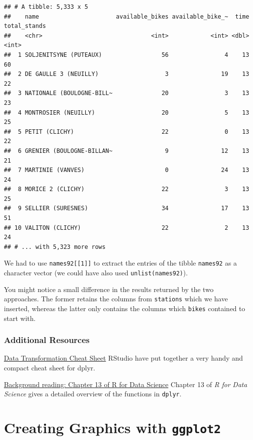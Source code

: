 \documentclass[
]{book}
\begin{document}
\begin{verbatim}
## # A tibble: 5,333 x 5
##    name                      available_bikes available_bike_~  time total_stands
##    <chr>                               <int>            <int> <dbl>        <int>
##  1 SOLJENITSYNE (PUTEAUX)                 56                4    13           60
##  2 DE GAULLE 3 (NEUILLY)                   3               19    13           22
##  3 NATIONALE (BOULOGNE-BILL~              20                3    13           23
##  4 MONTROSIER (NEUILLY)                   20                5    13           25
##  5 PETIT (CLICHY)                         22                0    13           22
##  6 GRENIER (BOULOGNE-BILLAN~               9               12    13           21
##  7 MARTINIE (VANVES)                       0               24    13           24
##  8 MORICE 2 (CLICHY)                      22                3    13           25
##  9 SELLIER (SURESNES)                     34               17    13           51
## 10 VALITON (CLICHY)                       22                2    13           24
## # ... with 5,323 more rows
\end{verbatim}

We had to use \texttt{names92{[}{[}1{]}{]}} to extract the entries of the tibble \texttt{names92} as a character vector (we could have also used \texttt{unlist(names92)}).

You might notice a small difference in the results returned by the two approaches. The former retains the columns from \texttt{stations} which we have inserted, whereas the latter only contains the columns which \texttt{bikes} contained to start with.

\hypertarget{additional-resources-2}{%
\subsection{Additional Resources}\label{additional-resources-2}}

\href{\%22https://www.rstudio.com/wp-content/uploads/2015/02/data-wrangling-cheatsheet.pdf\%22}{Data Transformation Cheat Sheet}
RStudio have put together a very handy and compact cheat sheet for dplyr.

\href{\%22http://r4ds.had.co.nz/relational-data.html\%22,\%20icon=\%22book\%22}{Background reading: Chapter 13 of R for Data Science}
Chapter 13 of \emph{R for Data Science} gives a detailed overview of the functions in \texttt{dplyr}.

\hypertarget{creating-graphics-with-ggplot2}{%
\chapter{\texorpdfstring{Creating Graphics with \texttt{ggplot2}}{Creating Graphics with ggplot2}}\label{creating-graphics-with-ggplot2}}
\end{document}
